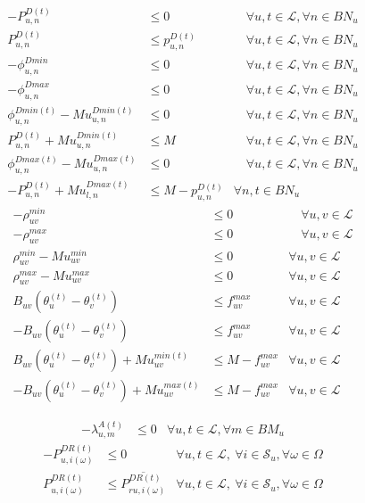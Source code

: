 \documentclass[a4j,10.5pt]{jarticle}
\begin{document}
\begin{align}
-P_{u,n}^{D(t)}&\le 0&\quad \forall u,t\in\mathcal{L},\forall n\in BN_u \tag{n-1}\\
P_{u,n}^{D(t)}&\le p_{u,n}^{D(t)}&\quad \forall u,t\in\mathcal{L},\forall n\in BN_u \tag{n-2}\\
 -\phi_{u,n}^{Dmin}&\le 0&\quad \forall u,t\in\mathcal{L},\forall n\in BN_u  \tag{n-3}\\
 -\phi_{u,n}^{Dmax}&\le 0&\quad \forall u,t\in\mathcal{L},\forall n\in BN_u  \tag{n-4}\\
 \phi_{u,n}^{Dmin(t)} - Mu^{Dmin(t)}_{u,n} &\le0&\quad \forall u,t\in\mathcal{L},\forall n\in BN_u  \tag{n-5}\\
P_{u,n}^{D(t)}+Mu^{Dmin(t)}_{u,n} &\le M&\quad \forall u,t\in\mathcal{L},\forall n\in BN_u \tag{n-6}\\
\phi_{u,n}^{Dmax(t)}-Mu^{Dmax(t)}_{u,n}&\le0&\quad \forall u,t\in\mathcal{L},\forall n\in BN_u  \tag{n-7}\\
-P_{u,n}^{D(t)}+Mu^{Dmax(t)}_{l ,n}&\le M-p_{u,n}^{D(t)}&\forall n,t\in BN_u \tag{n-8}
\end{align}
\begin{align}
 -\rho_{uv}^{min}&\le 0&\quad \forall u,v\in\mathcal{L}\tag{rho-1}\\
 -\rho_{uv}^{max}&\le 0&\quad \forall u,v\in\mathcal{L}\tag{rho-2}\\
\rho_{uv}^{min}-Mu^{min}_{uv}&\le 0&\forall u,v \in \mathcal{L} \tag{rho-3}\\
\rho_{uv}^{max}-Mu^{max}_{uv}&\le 0&\forall u,v \in \mathcal{L} \tag{rho-4}\\
B_{uv}(\theta_u^{(t)}-\theta_v^{(t)})&\le f_{uv}^{max}&\forall u,v \in \mathcal{L}\tag{rho-5}\\
-B_{uv}(\theta_u^{(t)}-\theta_v^{(t)})&\le f_{uv}^{max}&\forall u,v \in \mathcal{L}\tag{rho-6}\\
B_{uv}(\theta_u^{(t)}-\theta_v^{(t)})+Mu^{min(t)}_{uv}&\le M-f_{uv}^{max}&\forall u,v \in \mathcal{L}\tag{rho-7}\\
-B_{uv}(\theta_u^{(t)}-\theta_v^{(t)}) +Mu^{max(t)}_{uv}&\le M-f_{uv}^{max}&\forall u,v \in \mathcal{L}\tag{rho-8}
\end{align}

\begin{align}
-\lambda_{u,m}^{A(t)}&\le0&\forall u,t\in\mathcal{L},\forall m\in BM_u \tag{lambdaA}
\end{align}
\begin{align}
-P_{u,i(\omega)}^{DR(t)} &\le 0 & \forall u,t\in\mathcal{L},\ \forall i\in\mathcal{S}_u, \forall \omega \in \Omega \tag{PDR-1}\\
P_{u,i(\omega)}^{DR(t)} &\le \overline{P_{ru,i(\omega)}^{DR(t)}}  & \forall u,t\in\mathcal{L},\ \forall i\in\mathcal{S}_u, \forall \omega \in \Omega \tag{PDR-2}
\end{align}
\end{document}
